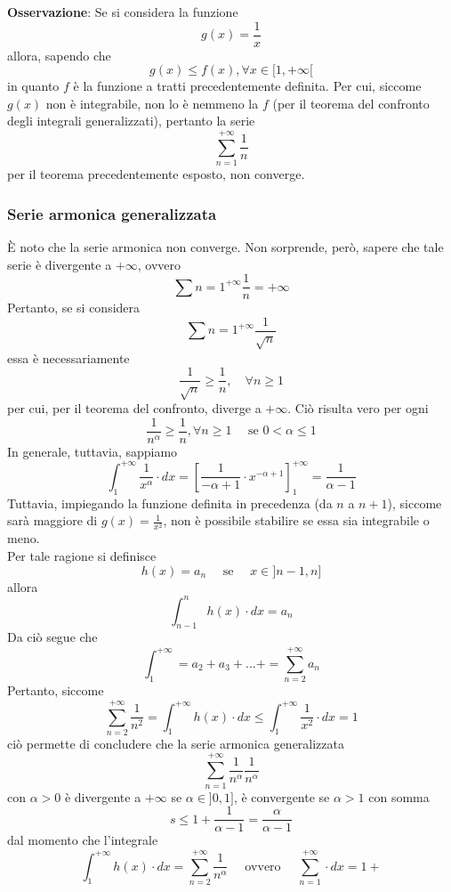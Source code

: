 \documentclass[a4paper]{extarticle}
\begin{document}
\vspace{1em}
\noindent
\textbf{Osservazione}: Se si considera la funzione
\[g(x)=\frac{1}{x}\]
allora, sapendo che
\[g(x) \leq f(x), \forall x \in [1,+\infty[\]
in quanto $f$ è la funzione a tratti precedentemente definita. Per cui, siccome $g(x)$ non è integrabile, non lo è nemmeno la $f$ (per il teorema del confronto degli integrali generalizzati), pertanto la serie
\[\sum_{n=1}^{+\infty} \frac{1}{n}\]
per il teorema precedentemente esposto, non converge.

\vspace{1em}
\noindent
\subsubsection{Serie armonica generalizzata}
È noto che la serie armonica non converge. Non sorprende, però, sapere che tale serie è divergente a $+\infty$, ovvero
\[\sum{n=1}^{+\infty} \frac{1}{n} = + \infty\]
Pertanto, se si considera
\[\sum{n=1}^{+\infty} \frac{1}{\sqrt{n}}\]
essa è necessariamente
\[\frac{1}{\sqrt{n}} \geq \frac{1}{n}, \hspace{1em} \forall n \geq 1\]
per cui, per il teorema del confronto, diverge a $+\infty$. Ciò risulta vero per ogni
\[\frac{1}{n^\alpha} \geq \frac{1}{n}, \forall n \geq 1 \hspace{1em} \text{ se } 0 < \alpha \leq 1\]
In generale, tuttavia, sappiamo
\[\int_1^{+\infty} \frac{1}{x^\alpha} \cdot dx = \left[\frac{1}{-\alpha+1} \cdot x^{-\alpha+1}\right]_1^{+\infty} = \frac{1}{\alpha-1}\]
Tuttavia, impiegando la funzione definita in precedenza (da $n$ a $n+1$), siccome sarà maggiore di $g(x)=\frac{1}{x^2}$, non è possibile stabilire se essa sia integrabile o meno.\\
Per tale ragione si definisce
\[h(x)=a_n \hspace{1em} \text{ se } \hspace{1em} x \in ]n-1,n]\]
allora
\[\int_{n-1}^n h(x) \cdot dx = a_n\]
Da ciò segue che
\[\int_1^{+\infty}=a_2+a_3+...+=\sum_{n=2}^{+\infty} a_n\]
Pertanto, siccome
\[\sum_{n=2}^{+\infty} \frac{1}{n^2} = \int_1^{+\infty} h(x) \cdot dx \leq \int_1^{+\infty} \frac{1}{x^2} \cdot dx = 1\]
ciò permette di concludere che la serie armonica generalizzata
\[\sum_{n=1}^{+\infty} \frac{1}{n^\alpha} \frac{1}{n^\alpha}\]
con $\alpha>0$ è divergente a $+\infty$ se $\alpha \in ]0,1]$, è convergente se $\alpha>1$ con somma
\[s \leq 1 + \frac{1}{\alpha - 1} = \frac{\alpha}{\alpha-1}\]
dal momento che l'integrale
\[\int_1^{+\infty} h(x) \cdot dx = \sum_{n=2}^{+\infty} \frac{1}{n^\alpha} \hspace{1em} \text{ ovvero } \hspace{1em} \sum_{n=1}^{+\infty}  \cdot dx = 1 +\]
\end{document}
